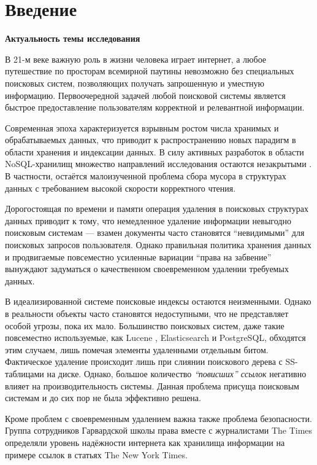 \newpage
\section{Введение}

\textbf{Актуальность темы исследования}

В 21-м веке важную роль в жизни человека играет интернет, а любое путешествие
по просторам всемирной паутины невозможно без специальных поисковых систем,
позволяющих получать запрошенную и уместную информацию. Первоочередной задачей
любой поисковой системы является быстрое предоставление пользователям
корректной и релевантной информации.

Современная эпоха характеризуется взрывным ростом числа хранимых и обрабатываемых
данных, что приводит к распространению новых парадигм в области хранения и
индексации данных. В силу активных разработок в области NoSQL-хранилищ множество
направлений исследования остаются незакрытыми \cite{No-SQL:IoT}.
В частности, остаётся малоизученной проблема сбора мусора в структурах данных
с требованием высокой скорости корректного чтения.

Дорогостоящая по времени и памяти операция удаления в поисковых структурах данных
приводит к тому, что немедленное удаление информации невыгодно поисковым системам
 — взамен документы часто становятся “невидимыми” для поисковых запросов
пользователя. Однако правильная политика хранения данных \cite{Data_Retention}
и продвигаемые повсеместно усиленные вариации “права на забвение” вынуждают
задуматься о качественном своевременном удалении требуемых данных.

В идеализированной системе поисковые индексы остаются неизменными. Однако в
реальности объекты часто становятся недоступными, что не представляет особой
угрозы, пока их мало. Большинство поисковых систем, даже такие повсеместно
используемые, как Lucene \cite{Lucene:2008}, Elasticsearch\cite{Elasticsearch:2020}
и PostgreSQL\cite{GIN:2020}, обходятся этим случаем, лишь помечая элементы
удаленными отдельным битом. Фактическое удаление происходит лишь при слиянии
поискового дерева с SS-таблицами на диске.
Однако, большое количество \textit{“повисших” ссылок} негативно влияет на
производительность системы. Данная проблема присуща поисковым
системам и до сих пор не была эффективно решена.

Кроме проблем с своевременным удалением важна также проблема безопасности.
Группа сотрудников Гарвардской школы права вместе с журналистами The Times определяли
уровень надёжности интернета как хранилища информации на примере ссылок в статьях
The New York Times.

